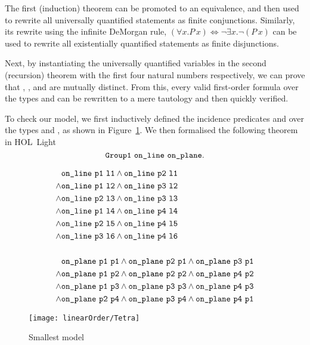 The first (induction) theorem can be promoted to an equivalence, and then used to rewrite all universally quantified statements as finite conjunctions. Similarly, its rewrite using the infinite DeMorgan rule, $(\forall x. P\,x) \iff \neg\exists x. \neg (P\,x)$ can be used to rewrite all existentially quantified statements as finite disjunctions.

Next, by instantiating the universally quantified variables in the second (recursion) theorem with the first four natural numbers respectively, we can prove that , ,  and  are mutually distinct. From this, every valid first-order formula over the types  and  can be rewritten to a mere tautology and then quickly verified.

To check our model, we first inductively defined the incidence predicates  and  over the types  and , as shown in Figure~\ref{fig:SmallestModel}. We then formalised the following theorem in HOL~Light 
\begin{displaymath}
\code{Group1}\ \code{on\_line}\ \code{on\_plane}.
\end{displaymath}

\begin{figure}
\begin{minipage}[c]{4cm}
\begin{align*}
& \texttt{on\_line}\ \texttt{p1}\ \texttt{l1}\wedge \texttt{on\_line}\ \texttt{p2}\ \texttt{l1}\\
\wedge & \texttt{on\_line}\ \texttt{p1}\ \texttt{l2}\wedge \texttt{on\_line}\ \texttt{p3}\ \texttt{l2}\\
\wedge & \texttt{on\_line}\ \texttt{p2}\ \texttt{l3}\wedge \texttt{on\_line}\ \texttt{p3}\ \texttt{l3}\\
\wedge & \texttt{on\_line}\ \texttt{p1}\ \texttt{l4}\wedge \texttt{on\_line}\ \texttt{p4}\ \texttt{l4}\\
\wedge & \texttt{on\_line}\ \texttt{p2}\ \texttt{l5}\wedge \texttt{on\_line}\ \texttt{p4}\ \texttt{l5}\\
\wedge & \texttt{on\_line}\ \texttt{p3}\ \texttt{l6}\wedge \texttt{on\_line}\ \texttt{p4}\ \texttt{l6}\\
\\
& \texttt{on\_plane}\ \texttt{p1}\ \texttt{p1}\wedge \texttt{on\_plane}\ \texttt{p2}\ \texttt{p1}\wedge \texttt{on\_plane}\ \texttt{p3}\ \texttt{p1}\\
\wedge & \texttt{on\_plane}\ \texttt{p1}\ \texttt{p2}\wedge \texttt{on\_plane}\ \texttt{p2}\ \texttt{p2}\wedge \texttt{on\_plane}\ \texttt{p4}\ \texttt{p2}\\
\wedge & \texttt{on\_plane}\ \texttt{p1}\ \texttt{p3}\wedge \texttt{on\_plane}\ \texttt{p3}\ \texttt{p3}\wedge \texttt{on\_plane}\ \texttt{p4}\ \texttt{p3}\\
\wedge & \texttt{on\_plane}\ \texttt{p2}\ \texttt{p4}\wedge \texttt{on\_plane}\ \texttt{p3}\ \texttt{p4}\wedge \texttt{on\_plane}\ \texttt{p4}\ \texttt{p1}
\end{align*}\end{minipage}\centering\texttt{[image: linearOrder/Tetra]}
\caption{Smallest model}\label{fig:SmallestModel}
\end{figure}

